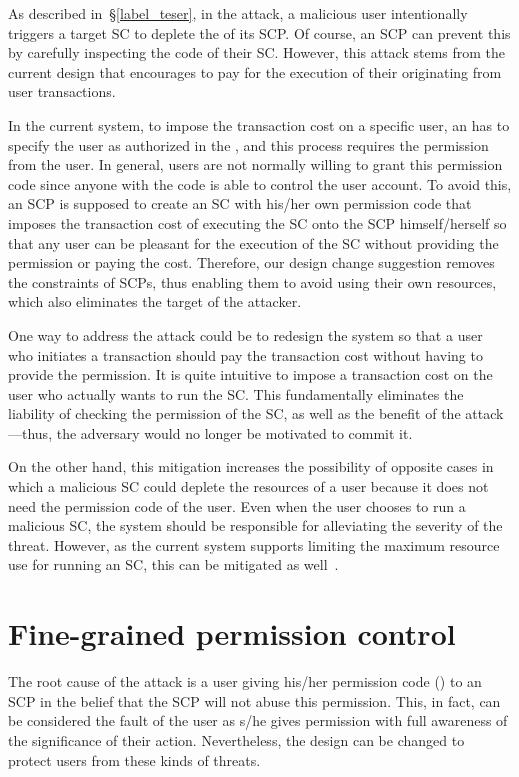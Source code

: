 As described in~\S\ref{label_teser}, in the \TESER attack, a malicious user intentionally
triggers a target SC to deplete the \cpu of its SCP. Of course, an SCP can
prevent this by carefully inspecting the code of their SC. However, this attack
stems from the current design that encourages \SCPs to pay for the execution of
their \SCs originating from user transactions.

In the current \eos system, to impose the transaction cost on a specific user,
an \SCP has to specify the user as authorized in the \SC, and this process
requires the \code permission from the user. In general, users are not normally
willing to grant this permission code since anyone with the code is able to
control the user account.
%
To avoid this, an SCP is supposed to create an SC with his/her own permission
code that imposes the transaction cost of executing the SC onto the SCP
himself/herself so that any user can be pleasant for the execution of the SC
without providing the permission or paying the cost.
%
Therefore, our design change suggestion removes the constraints of SCPs, thus
enabling them to avoid using their own resources, which also eliminates the
target of the attacker.

One way to address the \TESER attack could be to redesign the \eos system so that a user
who initiates a transaction should pay the transaction cost without having to
provide the \code permission.
%
It is quite intuitive to impose a transaction cost on the user who actually
wants to run the SC.
%
This fundamentally eliminates the liability of checking the permission of the
SC, as well as the benefit of the attack---thus, the adversary would no longer be
motivated to commit it.

On the other hand, this mitigation increases the possibility of opposite
cases in which a malicious SC could deplete the resources of a user because it 
does not need the permission code of the user.
%
Even when the user chooses to run a malicious SC, the system should be
responsible for alleviating the severity of the threat.
%
However, as the current \eos system supports limiting the maximum resource use
for running an SC, this can be mitigated as well~\cite{resourcemaxusage}.

\section{Fine-grained permission control}
\label{ss:fine}

The root cause of the \TOCTOU attack is a user giving his/her permission code
(\code) to an SCP in the belief that the SCP will not abuse this permission.
This, in fact, can be considered the fault of the user as s/he gives permission
with full awareness of the significance of their action. Nevertheless, the \eos
design can be changed to protect users from these kinds of threats.

